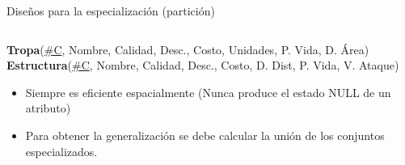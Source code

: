 \begin{frame}{Dise\~nos para la especializaci\'on (partici\'on)}
\begin{columns}[T]
\begin{column}{0.48\linewidth}
\begin{scriptsize}
                \textbf{Tropa}(\underline{\#C}, Nombre, Calidad, Desc., Costo, Unidades, P. Vida, D. \'Area)\\[1mm]
               
                \textbf{Estructura}(\underline{\#C}, Nombre, Calidad, Desc., Costo, D. Dist, P. Vida, V. Ataque)\\[1mm]
             
            \end{scriptsize}
            \vspace{15mm}

            \begin{itemize}
                \item Siempre es eficiente espacialmente (Nunca produce el estado NULL de un atributo)
                \item Para obtener la generalizaci\'on se debe calcular la uni\'on de los conjuntos especializados.
            \end{itemize}
        \end{column}
        
    \end{columns}
\end{frame}


